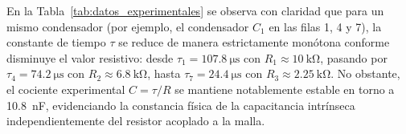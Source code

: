 En la Tabla~\ref{tab:datos_experimentales} se observa con claridad que para un mismo condensador (por ejemplo, el condensador $C_1$ en las filas 1, 4 y 7), la constante de tiempo $\tau$ se reduce de manera estrictamente monótona conforme disminuye el valor resistivo: desde $\tau_1 = \qty{107,8}{\micro\second}$ con $R_1 \approx \qty{10}{\kilo\ohm}$, pasando por $\tau_4 = \qty{74,2}{\micro\second}$ con $R_2 \approx \qty{6,8}{\kilo\ohm}$, hasta $\tau_7 = \qty{24,4}{\micro\second}$ con $R_3 \approx \qty{2,25}{\kilo\ohm}$. No obstante, el cociente experimental $C = \tau / R$ se mantiene notablemente estable en torno a \qty{10,8}{\nano\farad}, evidenciando la constancia física de la capacitancia intrínseca independientemente del resistor acoplado a la malla.